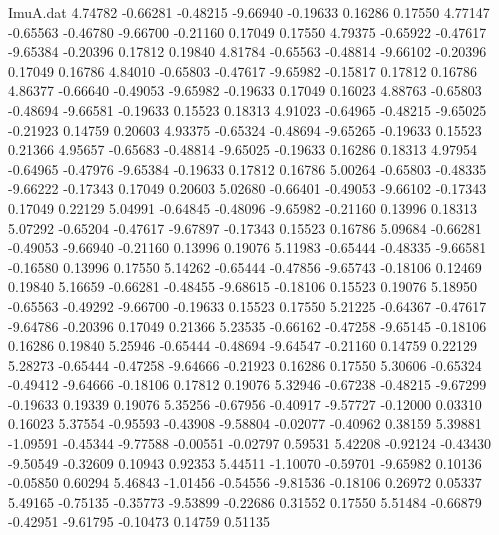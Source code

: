 \begin{filecontents}{ImuA.dat}
   4.74782   -0.66281   -0.48215   -9.66940   -0.19633    0.16286    0.17550
   4.77147   -0.65563   -0.46780   -9.66700   -0.21160    0.17049    0.17550
   4.79375   -0.65922   -0.47617   -9.65384   -0.20396    0.17812    0.19840
   4.81784   -0.65563   -0.48814   -9.66102   -0.20396    0.17049    0.16786
   4.84010   -0.65803   -0.47617   -9.65982   -0.15817    0.17812    0.16786
   4.86377   -0.66640   -0.49053   -9.65982   -0.19633    0.17049    0.16023
   4.88763   -0.65803   -0.48694   -9.66581   -0.19633    0.15523    0.18313
   4.91023   -0.64965   -0.48215   -9.65025   -0.21923    0.14759    0.20603
   4.93375   -0.65324   -0.48694   -9.65265   -0.19633    0.15523    0.21366
   4.95657   -0.65683   -0.48814   -9.65025   -0.19633    0.16286    0.18313
   4.97954   -0.64965   -0.47976   -9.65384   -0.19633    0.17812    0.16786
   5.00264   -0.65803   -0.48335   -9.66222   -0.17343    0.17049    0.20603
   5.02680   -0.66401   -0.49053   -9.66102   -0.17343    0.17049    0.22129
   5.04991   -0.64845   -0.48096   -9.65982   -0.21160    0.13996    0.18313
   5.07292   -0.65204   -0.47617   -9.67897   -0.17343    0.15523    0.16786
   5.09684   -0.66281   -0.49053   -9.66940   -0.21160    0.13996    0.19076
   5.11983   -0.65444   -0.48335   -9.66581   -0.16580    0.13996    0.17550
   5.14262   -0.65444   -0.47856   -9.65743   -0.18106    0.12469    0.19840
   5.16659   -0.66281   -0.48455   -9.68615   -0.18106    0.15523    0.19076
   5.18950   -0.65563   -0.49292   -9.66700   -0.19633    0.15523    0.17550
   5.21225   -0.64367   -0.47617   -9.64786   -0.20396    0.17049    0.21366
   5.23535   -0.66162   -0.47258   -9.65145   -0.18106    0.16286    0.19840
   5.25946   -0.65444   -0.48694   -9.64547   -0.21160    0.14759    0.22129
   5.28273   -0.65444   -0.47258   -9.64666   -0.21923    0.16286    0.17550
   5.30606   -0.65324   -0.49412   -9.64666   -0.18106    0.17812    0.19076
   5.32946   -0.67238   -0.48215   -9.67299   -0.19633    0.19339    0.19076
   5.35256   -0.67956   -0.40917   -9.57727   -0.12000    0.03310    0.16023
   5.37554   -0.95593   -0.43908   -9.58804   -0.02077   -0.40962    0.38159
   5.39881   -1.09591   -0.45344   -9.77588   -0.00551   -0.02797    0.59531
   5.42208   -0.92124   -0.43430   -9.50549   -0.32609    0.10943    0.92353
   5.44511   -1.10070   -0.59701   -9.65982    0.10136   -0.05850    0.60294
   5.46843   -1.01456   -0.54556   -9.81536   -0.18106    0.26972    0.05337
   5.49165   -0.75135   -0.35773   -9.53899   -0.22686    0.31552    0.17550
   5.51484   -0.66879   -0.42951   -9.61795   -0.10473    0.14759    0.51135

\end{filecontents}
